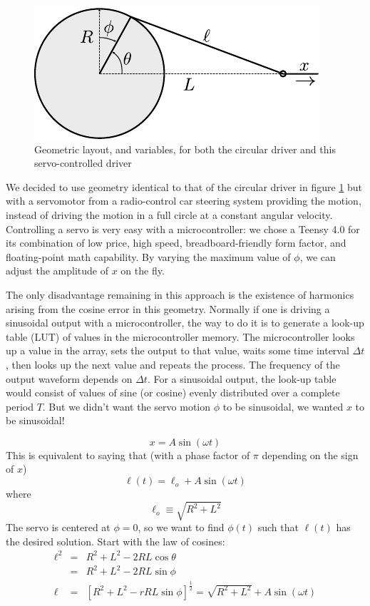 \documentclass[11 pt]{article}
\begin{document}
\begin{figure}[ht]
	\begin{center}
		\includegraphics{geometry}
	\end{center}
	\caption{Geometric layout, and variables, for both the circular driver and this servo-controlled driver}
	\label{fig:circular}
\end{figure}

We decided to use geometry identical to that of the circular driver in figure \ref{fig:circular} but with a servomotor from a radio-control car steering system providing the motion, instead of driving the motion in a full circle at a constant angular velocity. 
Controlling a servo is very easy with a microcontroller: we chose a Teensy 4.0 for its combination of low price, high speed, breadboard-friendly form factor, and floating-point math capability.
By varying the maximum value of $\phi$, we can adjust the amplitude of $x$ on the fly. 

The only disadvantage remaining in this approach is the existence of harmonics arising from the cosine error in this geometry. 
Normally if one is driving a sinusoidal output with a microcontroller, the way to do it is to generate a look-up table (LUT) of values in the microcontroller memory.
The microcontroller looks up a value in the array, sets the output to that value, waits some time interval $\Delta t$, then looks up the next value and repeats the process. 
The frequency of the output waveform depends on $\Delta t$.
For a sinusoidal output, the look-up table would consist of values of sine (or cosine) evenly distributed over a complete period $T$.
But we didn't want the servo motion $\phi$ to be sinusoidal, we wanted $x$ to be sinusoidal!

\[ x = A \sin(\omega t) \]
This is equivalent to saying that (with a phase factor of $\pi$ depending on the sign of $x$)
\[ \ell(t) = \ell_o + A \sin(\omega t) \]
where 
\[ \ell_o \equiv \sqrt{R^2+L^2} \]
The servo is centered at $\phi=0$, so we want to find $\phi(t)$ such that $\ell(t)$ has the desired solution.
Start with the law of cosines:
\begin{eqnarray*} 
	\ell^2 &=& R^2 + L^2 - 2 R L \cos\theta\\
		&=& R^2 + L^2 - 2 R L \sin\phi\\
	\ell &=& \left[ R^2+L^2 - r R L \sin\phi \right]^{\frac{1}{2}} = \sqrt{R^2+L^2} + A \sin(\omega t)
\end{eqnarray*}
\end{document}
